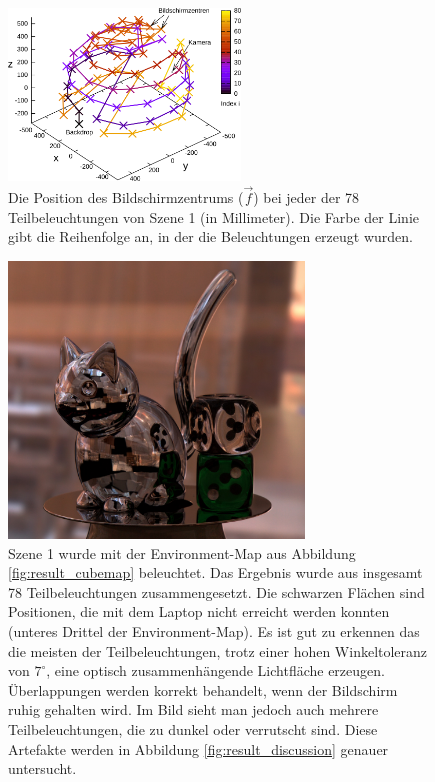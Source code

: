     \begin{figure}[H]
    \centering
    \includegraphics[width=0.55\textwidth]{../graphics/ergebnisse/positions.svg}
    \caption[Ergebnis: Szene 1 (Bildschirmpositionen als 3D-Plot)]{Die Position des Bildschirmzentrums ($\vec{f}$) bei jeder der 78 Teilbeleuchtungen von Szene 1 (in Millimeter). Die Farbe der Linie gibt die Reihenfolge an, in der die Beleuchtungen erzeugt wurden.}
    \label{fig:result_positions}
   \end{figure}


\pagebreak
   \begin{figure}[H]
    \centering
    \includegraphics[width=0.7\textwidth]{../graphics/ergebnisse/result_all_extended.jpg}
    \caption[Ergebnis: Szene 1]{ Szene 1 wurde mit der Environment-Map aus Abbildung \ref{fig:result_cubemap} beleuchtet. Das Ergebnis wurde aus insgesamt 78 Teilbeleuchtungen zusammengesetzt.  
    Die schwarzen Flächen sind Positionen, die mit dem Laptop nicht erreicht werden konnten (unteres Drittel der Environment-Map).
    Es ist gut zu erkennen das die meisten der Teilbeleuchtungen, trotz einer hohen Winkeltoleranz von $7^\circ$, eine optisch zusammenhängende  Lichtfläche erzeugen. Überlappungen werden korrekt behandelt, wenn der Bildschirm ruhig gehalten wird.
    Im Bild sieht man jedoch auch mehrere Teilbeleuchtungen, die zu dunkel oder verrutscht sind.
    Diese Artefakte werden in  Abbildung \ref{fig:result_discussion} genauer untersucht.
}

    \label{fig:result}
   \end{figure}


